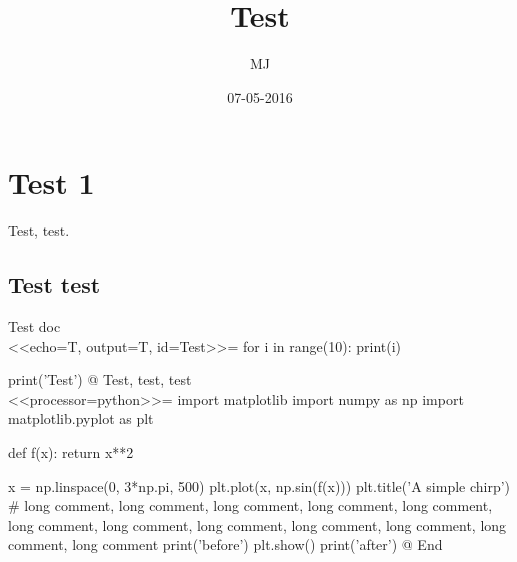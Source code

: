 \documentclass{article}
\title{Test}
\date{07-05-2016}
\author{MJ}
\begin{document}
	\maketitle
	\newpage

	\section{Test 1}
	Test, test.

	\subsection{Test test}
	Test doc\\
	<<echo=T, output=T, id=Test>>=
for i in range(10):
    print(i)

print('Test')
    @
	Test, test, test\\
	<<processor=python>>=
import matplotlib
import numpy as np
import matplotlib.pyplot as plt

def f(x):
    return x**2

x = np.linspace(0, 3*np.pi, 500)
plt.plot(x, np.sin(f(x)))
plt.title('A simple chirp')
# long comment, long comment, long comment, long comment, long comment, long comment, long comment, long comment, long comment, long comment, long comment, long comment
print('before')
plt.show()
print('after')
    @
	End
\end{document}
